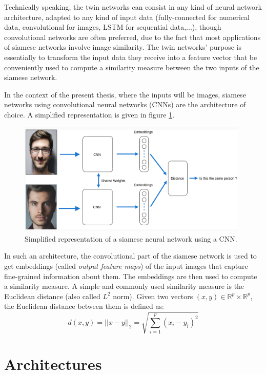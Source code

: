 \documentclass[11pt]{report}
\begin{document}
Technically speaking, the twin networks can consist in any kind of neural network architecture, adapted to any kind of input data (fully-connected for numerical data, convolutional for images, LSTM for sequential data,...), though convolutional networks are often preferred, due to the fact that most applications of siamese networks involve image similarity. The twin networks' purpose is essentially to transform the input data they receive into a feature vector that be conveniently used to compute a similarity measure between the two inputs of the siamese network.\newline 

In the context of the present thesis, where the inputs will be images, siamese networks using convolutional neural networks (CNNs) are the architecture of choice. A simplified representation is given in figure \ref{siam}.


\begin{figure}[H]
\centering\includegraphics[width=11cm]{siam.PNG}
\caption{Simplified representation of a siamese neural network using a CNN.}
\label{siam}
\end{figure}

In such an architecture, the convolutional part of the siamese network is used to get embeddings (called \emph{output feature maps}) of the input images that capture fine-grained information about them. The embeddings are then used to compute a similarity measure. A simple and commonly used similarity measure is the Euclidean distance (also called $L^2$ norm).\newline
Given two vectors $(x,y) \in \mathbb{R}^p \times \mathbb{R}^p$, the Euclidean distance between them is defined as:
$$d(x,y) = ||x - y||_{2} = \sqrt{\sum_{i = 1}^{p} (x_i - y_i)^2}$$

\section{Architectures}
\label{sec:arch}
\end{document}
